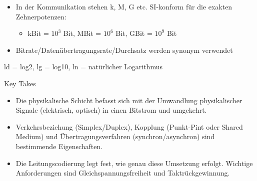 \begin{remark}
    \begin{itemize}
        \item In der Kommunikation stehen k, M, G etc. SI-konform für die exakten Zehnerpotenzen:
        \begin{itemize}
            \item kBit = $10^3$ Bit, MBit = $10^6$ Bit, GBit = $10^9$ Bit
        \end{itemize}
        \item Bitrate/Datenübertragungsrate/Durchsatz werden synonym verwendet
    \end{itemize}
\end{remark}

\begin{remark}
    ld = log2, lg = log10, ln = natürlicher Logarithmus
\end{remark}

\begin{KR}{Key Takes}
    \begin{itemize}
        \item Die physikalische Schicht befasst sich mit der Umwandlung physikalischer Signale (elektrisch, optisch) in einen Bitstrom und umgekehrt.
        \item Verkehrsbeziehung (Simplex/Duplex), Kopplung (Punkt-Pint oder Shared Medium) und Übertragungsverfahren (synchron/asynchron) sind bestimmende Eigenschaften.
        \item Die Leitungscodierung legt fest, wie genau diese Umsetzung erfolgt. Wichtige Anforderungen sind Gleichspannungsfreiheit und Taktrückgewinnung.
    \end{itemize}
\end{KR}